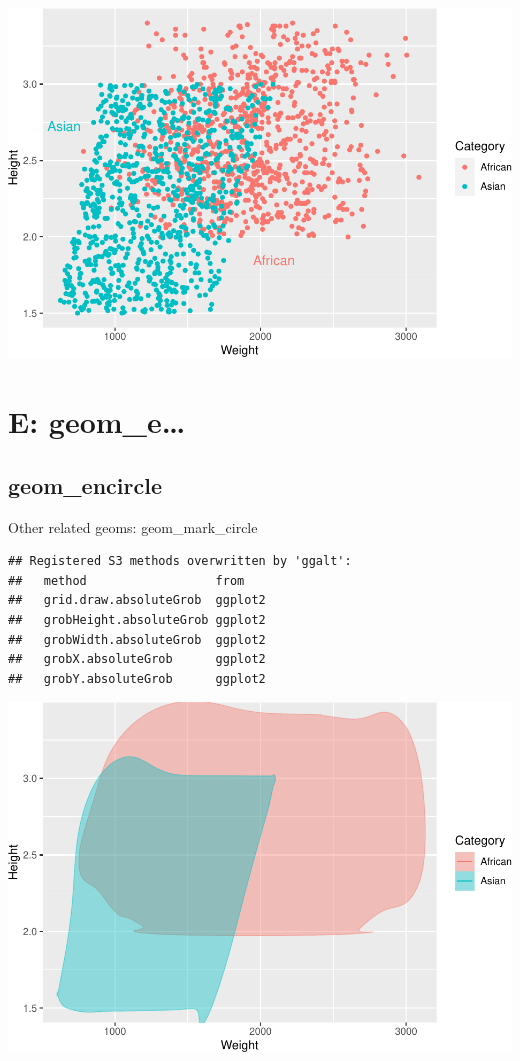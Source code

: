 \documentclass[
]{book}
\begin{document}
\includegraphics{Data-Visualisation-geom-Encyclopedia_files/figure-latex/unnamed-chunk-35-1.pdf}

\hypertarget{e-geom_e}{%
\chapter{E: geom\_e\ldots{}}\label{e-geom_e}}

\hypertarget{geom_encircle}{%
\section{geom\_encircle}\label{geom_encircle}}

Other related geoms: geom\_mark\_circle

\begin{verbatim}
## Registered S3 methods overwritten by 'ggalt':
##   method                  from   
##   grid.draw.absoluteGrob  ggplot2
##   grobHeight.absoluteGrob ggplot2
##   grobWidth.absoluteGrob  ggplot2
##   grobX.absoluteGrob      ggplot2
##   grobY.absoluteGrob      ggplot2
\end{verbatim}

\includegraphics{Data-Visualisation-geom-Encyclopedia_files/figure-latex/unnamed-chunk-36-1.pdf}
\end{document}
